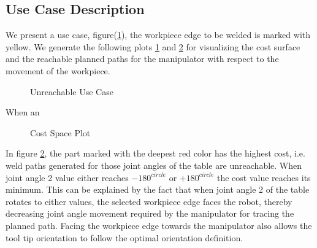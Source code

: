 \subsection{Use Case Description}
\label{ssec:usc1}
We present a use case, figure(\ref{fig:rc1}), the  workpiece edge to be welded is marked with yellow. We generate the following plots \ref{fig:rc1} and \ref{fig:rc2} for visualizing the cost surface and the reachable planned paths for
 the manipulator with respect to the movement of the workpiece.
\begin{figure}[!ht] %
	\centering
	\caption{Unreachable Use Case}
	\label{fig:rc1}
\end{figure} 
When an

\begin{figure}[!ht] %
	\centering
	\caption{Cost Space Plot}
	\label{fig:rc2}
\end{figure}

In figure \ref{fig:rc2}, the part marked with the deepest red color has the highest cost, i.e. weld paths generated for those joint angles of the table are unreachable. When joint angle 2 value either reaches $-180^{circle}$ or $+180^{circle}$ the cost value reaches its minimum. This can be explained by the fact that when joint angle 2 of the table rotates to either values, the selected workpiece edge faces the robot, thereby decreasing joint angle movement required by the manipulator for tracing the planned path. Facing the workpiece edge towards the manipulator also allows the tool tip orientation to follow the optimal orientation definition. 

